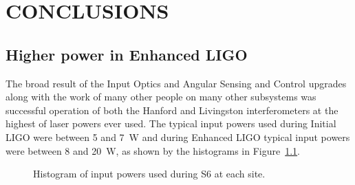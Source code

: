 \chapter{CONCLUSIONS}


\section{Higher power in Enhanced LIGO}
The broad result of the Input Optics and Angular Sensing and Control
upgrades along with the work of many other people on many other
subsystems was successful operation of both the Hanford and Livingston
interferometers at the highest of laser powers ever used. The typical
input powers used during Initial LIGO were between 5 and 7~W and
during Enhanced LIGO typical input powers were between 8 and 20~W, as
shown by the histograms in Figure~\ref{fig:S6pwrs}. 

\begin{figure}
\begin{centering}
\caption[Histogram of input powers used during S6]{Histogram of input
  powers used during S6 at each site.}
\label{fig:S6pwrs}
\end{centering}
\end{figure}

